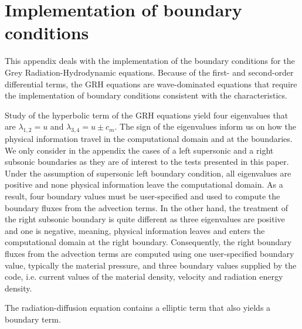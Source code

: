 \section{Implementation of boundary conditions} \label{App:AppendixA}
This appendix deals with the implementation of the boundary conditions for the Grey Radiation-Hydrodynamic equations. Because of the first- and second-order differential terms, the GRH equations are wave-dominated equations that require the implementation of boundary conditions consistent with the characteristics. 

Study of the hyperbolic term of the GRH equations yield four eigenvalues that are $\lambda_{1,2}=u$ and $\lambda_{3,4}=u \pm c_m$. The sign of the eigenvalues inform us on how the physical information travel in the computational domain and at the boundaries. We only consider in the appendix the cases of a left supersonic and a right subsonic boundaries as they are of interest to the tests presented in this paper. Under the assumption of supersonic left boundary condition, all eigenvalues are positive and none physical information leave the computational domain. As a result, four boundary values must be user-specified and used to compute the boundary fluxes from the advection terms. In the other hand, the treatment of the right subsonic boundary is quite different as three eigenvalues are positive and one is negative, meaning, physical information leaves and enters the computational domain at the right boundary. Consequently, the right boundary fluxes from the advection terms are computed using one user-specified boundary value, typically the material pressure, and three boundary values supplied by the code, i.e. current values of the material density, velocity and radiation energy density. 

The radiation-diffusion equation contains a elliptic term that also yields a boundary term.

